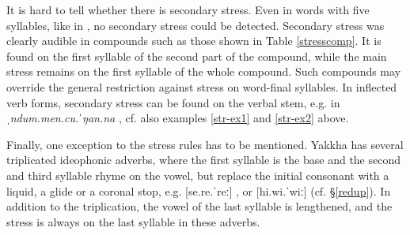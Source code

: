 It is hard to tell whether there is secondary stress. Even in words with five syllables, like in \Last[b], no secondary stress could be detected.  Secondary stress was clearly audible in compounds such as those shown in Table \ref{stresscomp}.  It is found on the first syllable of the second part of the compound, while the main stress remains on the first syllable of the whole compound. Such compounds may override the general restriction against stress on word-final syllables. In inflected verb forms, secondary stress can be found on the verbal stem, e.g. in \emph{ˌndum.men.cu.ˈŋan.na} , cf. also examples \ref{str-ex1} and \ref{str-ex2} above.

 

 \begin{table}[htp]	
 \begin{center}		
\end{center}
\end{table}



Finally, one exception to the stress rules has to be mentioned. Yakkha has several triplicated ideophonic adverbs, where the first syllable is the base and the second and third syllable rhyme on the vowel, but replace the initial consonant with a liquid, a glide or a coronal stop, e.g. [se.re.ˈreː] , or [hi.wi.ˈwiː]  (cf. §\ref{redup}). In addition to the triplication, the vowel of the last syllable is lengthened, and the stress is always on the last syllable in these adverbs.



